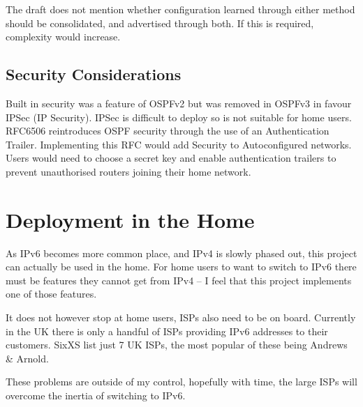 \documentclass[12pt,a4paper,twoside]{report}
\begin{document}
The draft does not mention whether configuration learned through either method
should be consolidated, and advertised through both. If this is required,
complexity would increase.

\subsection{Security Considerations} 
Built in security was a feature of OSPFv2 but was removed in OSPFv3 in favour
IPSec (IP Security). IPSec is difficult to deploy so is not suitable for home
users. RFC6506 reintroduces OSPF security through the use of an Authentication
Trailer\cite{rfc6506}. Implementing this RFC would add Security to
Autoconfigured networks. Users would need to choose a secret key and enable
authentication trailers to prevent unauthorised routers joining their home
network.  

\section{Deployment in the Home}
As IPv6 becomes more common place, and IPv4 is slowly phased out, this project can 
actually be used in the home. For home users to want to switch to IPv6 there must 
be features they cannot get from IPv4 -- I feel that this project 
implements one of those features.

It does not however stop at home users, ISPs also need to be on board.
Currently in the UK there is only a handful of ISPs providing IPv6 addresses to
their customers. SixXS list just 7 UK ISPs, the most popular of these being
Andrews \& Arnold.

These problems are outside of my control, hopefully with time, the
large ISPs will overcome the inertia of switching to IPv6.

\raggedbottom
\pagebreak

\printnomenclature
{}
\raggedbottom
\pagebreak

{}
{}



\end{document}
